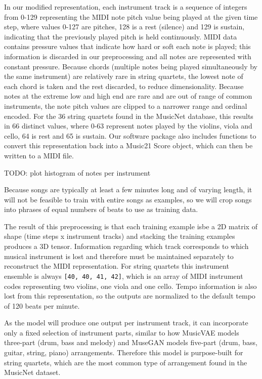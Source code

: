 \documentclass[sigconf,authorversion]{acmart}
\begin{document}
In our modified representation, each instrument track is a sequence of
integers from 0-129 representing the MIDI note pitch value being
played at the given time step, where values 0-127 are pitches, 128 is
a rest (silence) and 129 is sustain, indicating that the previously
played pitch is held continuously. MIDI data contains pressure values
that indicate how hard or soft each note is played; this information
is discarded in our preprocessing and all notes are represented with
constant pressure. Because chords (multiple notes being played
simultaneously by the same instrument) are relatively rare in string
quartets, the lowest note of each chord is taken and the rest
discarded, to reduce dimensionality. Because notes at the extreme low
and high end are rare and are out of range of common instruments, the
note pitch values are clipped to a narrower range and ordinal
encoded. For the 36 string quartets found in the MusicNet database,
this results in 66 distinct values, where 0-63 represent notes played
by the violins, viola and cello, 64 is rest and 65 is sustain. Our
software package also includes functions to convert this
representation back into a Music21 Score object, which can then be
written to a MIDI file.

TODO: plot histogram of notes per instrument

Because songs are typically at least a few minutes long and of varying
length, it will not be feasible to train with entire songs as
examples, so we will crop songs into phrases of equal numbers of
beats to use as training data.

The result of this preprocessing is that each training example isbe a
2D matrix of shape (time steps x instrument tracks) and stacking the
training examples produces a 3D tensor. Information regarding which
track corresponds to which musical instrument is lost and therefore
must be maintained separately to reconstruct the MIDI
representation. For string quartets this instrument ensemble is always
\texttt{[40, 40, 41, 42]}, which is an array of MIDI instrument codes
representing two violins, one viola and one cello. Tempo information
is also lost from this representation, so the outputs are normalized
to the default tempo of 120 beats per minute.

As the model will produce one output per instrument track, it can
incorporate only a fixed selection of instrument parts, similar to how
MusicVAE models three-part (drum, bass and melody)
\cite{roberts_hierarchical_2018} and MuseGAN models five-part (drum,
bass, guitar, string, piano) arrangements. Therefore this model is
purpose-built for string quartets, which are the most common type of
arrangement found in the MusicNet dataset.
\end{document}
